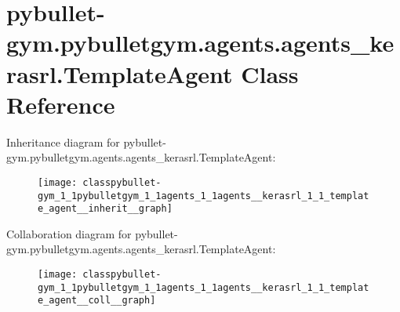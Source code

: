 \hypertarget{classpybullet-gym_1_1pybulletgym_1_1agents_1_1agents__kerasrl_1_1_template_agent}{}\section{pybullet-\/gym.pybulletgym.\+agents.\+agents\+\_\+kerasrl.\+Template\+Agent Class Reference}
\label{classpybullet-gym_1_1pybulletgym_1_1agents_1_1agents__kerasrl_1_1_template_agent}


Inheritance diagram for pybullet-\/gym.pybulletgym.\+agents.\+agents\+\_\+kerasrl.\+Template\+Agent\+:
\nopagebreak
\begin{figure}[H]
\begin{center}
\leavevmode
\texttt{[image: classpybullet-gym\_1\_1pybulletgym\_1\_1agents\_1\_1agents\_\_kerasrl\_1\_1\_template\_agent\_\_inherit\_\_graph]}
\end{center}
\end{figure}


Collaboration diagram for pybullet-\/gym.pybulletgym.\+agents.\+agents\+\_\+kerasrl.\+Template\+Agent\+:
\nopagebreak
\begin{figure}[H]
\begin{center}
\leavevmode
\texttt{[image: classpybullet-gym\_1\_1pybulletgym\_1\_1agents\_1\_1agents\_\_kerasrl\_1\_1\_template\_agent\_\_coll\_\_graph]}
\end{center}
\end{figure}
